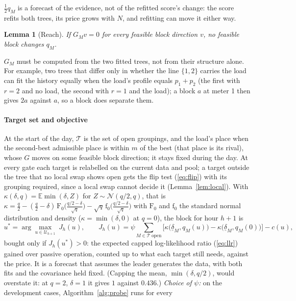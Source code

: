 \documentclass[journal,onecolumn,11pt]{IEEEtran}
\newtheorem{lemma}{Lemma}
\newcommand{\Tset}{\mathcal{T}}
\newcommand{\Uset}{\mathcal{U}}
\begin{document}
$\tfrac12q_M$ is a forecast of the evidence, not of the refitted score's change: the score refits both trees, its price grows
with $N$, and refitting can move it either way.
\begin{lemma}[Reach]\label{lem:reach}
If $G_Mv=0$ for every feasible block direction $v$, no feasible block changes $q_M$.
\end{lemma}
$G_M$ must be computed from the two fitted trees, not from their structure alone. For example, two trees that differ only in
whether the line $\{1,2\}$ carries the load can fit the history equally when the load's profile equals $p_1+p_2$ (the first
with $r=2$ and no load, the second with $r=1$ and the load); a block $a$ at meter 1 then gives $2a$ against $a$, so a block
does separate them.

\paragraph*{Target set and objective} At the start of the day, $\Tset$ is the set of open groupings, and the load's place
when the second-best admissible place is within $m$ of the best (that place is its rival), whose $G$ moves on some feasible
block direction; it stays fixed during the day. At every gate each target is relabelled on the current data and pool; a
target outside the tree that no local swap shows open gets the flip test (\ref{eq:flip}) with its grouping required, since a
local swap cannot decide it (Lemma~\ref{lem:local}). With
$\kappa(\delta,q)=\mathbb E\min(\delta,Z)$ for $Z\sim\mathcal N(q/2,q)$, that is
$\kappa=\tfrac q2-(\tfrac q2-\delta)\,\mathrm F_0\big(\tfrac{q/2-\delta}{\sqrt q}\big)-\sqrt q\,\mathrm f_0\big(\tfrac{q/2-\delta}{\sqrt q}\big)$
with $\mathrm F_0$ and $\mathrm f_0$ the standard normal distribution and density ($\kappa=\min(\delta,0)$ at $q=0$), the
block for hour $h+1$ is
\begin{equation}\label{eq:block}
u^\ast=\arg\max_{u\in\Uset_{h+1}}\ J_h(u),\qquad
J_h(u)=\psi\sum_{M\in\Tset\ \text{open}}\Big[\kappa\big(\underline\delta_M,q_M(u)\big)-\kappa\big(\underline\delta_M,q_M(0)\big)\Big]-c(u),
\end{equation}
bought only if $J_h(u^\ast)>0$: the expected capped log-likelihood ratio (\ref{eq:llr}) gained over passive operation,
counted up to what each target still needs, against the price. It is a forecast that assumes the leader generates the data,
with both fits and the covariance held fixed. (Capping the mean, $\min(\delta,q/2)$, would overstate it: at $q=2$, $\delta=1$
it gives $1$ against $0.436$.) \emph{Choice of $\psi$:} on the development cases, Algorithm~\ref{alg:probe} runs for every
\end{document}
